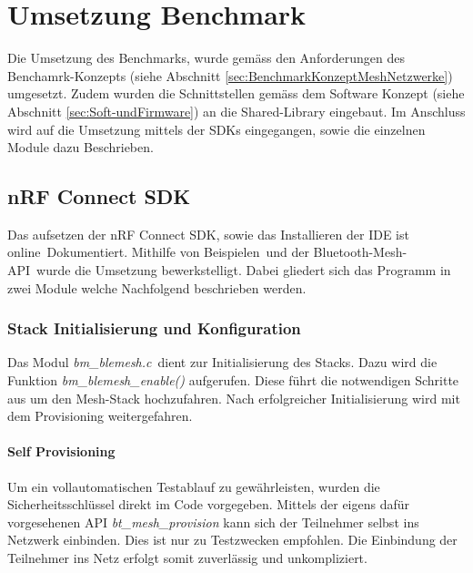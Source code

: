 \clearpage
\section{Umsetzung Benchmark}\label{sec:BTMeshUmsetzungBenchmark}
Die Umsetzung des Benchmarks, wurde gemäss den Anforderungen des Benchamrk-Konzepts (siehe Abschnitt \ref{sec:BenchmarkKonzeptMeshNetzwerke}) umgesetzt. Zudem wurden die Schnittstellen gemäss dem Software Konzept (siehe Abschnitt \ref{sec:Soft-undFirmware}) an die Shared-Library eingebaut. Im Anschluss wird auf die Umsetzung mittels der SDKs eingegangen, sowie die einzelnen Module dazu Beschrieben. 

\subsection{nRF Connect SDK}\label{subsec:BluetoothMeshUmsetzungnRFConnectSDK} 
Das aufsetzen der nRF Connect SDK, sowie das Installieren der IDE ist online\footnotemark\ Dokumentiert. Mithilfe von Beispielen\footnotemark\ und der Bluetooth-Mesh-API\footnotemark\ wurde die Umsetzung bewerkstelligt. Dabei gliedert sich das Programm in zwei Module welche Nachfolgend beschrieben werden.




\subsubsection{Stack Initialisierung und Konfiguration}\label{subsubsec:BluetoothMeshUmsetzungnRFConnectSDKInitandConfig} 
Das Modul \textit{bm\_blemesh.c}\footnotemark\ dient zur Initialisierung des Stacks. Dazu wird die Funktion \linebreak\textit{bm\_blemesh\_enable()} aufgerufen. Diese führt die notwendigen Schritte aus um den Mesh-Stack hochzufahren. Nach erfolgreicher Initialisierung wird mit dem Provisioning weitergefahren.




\paragraph{Self Provisioning}
Um ein vollautomatischen Testablauf zu gewährleisten, wurden die Sicherheitsschlüssel direkt im Code vorgegeben. Mittels der eigens dafür vorgesehenen API \textit{bt\_mesh\_provision} kann sich der Teilnehmer selbst ins Netzwerk einbinden. Dies ist nur zu Testzwecken empfohlen. Die Einbindung der Teilnehmer ins Netz erfolgt somit zuverlässig und unkompliziert.

